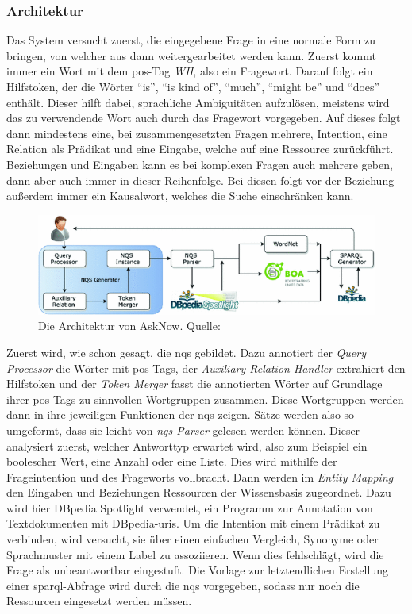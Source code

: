\subsubsection{Architektur}

Das System versucht zuerst, die eingegebene Frage in eine normale Form zu bringen, von welcher aus dann weitergearbeitet werden kann.
Zuerst kommt immer ein Wort mit dem \ac{pos}-Tag \emph{WH}, also ein Fragewort.
Darauf folgt ein Hilfstoken, der die Wörter \enquote{is}, \enquote{is kind of}, \enquote{much}, \enquote{might be} und \enquote{does} enthält.
Dieser hilft dabei, sprachliche Ambiguitäten aufzulösen, meistens wird das zu verwendende Wort auch durch das Fragewort vorgegeben.
Auf dieses folgt dann mindestens eine, bei zusammengesetzten Fragen mehrere, Intention, eine Relation als Prädikat und eine Eingabe, welche auf eine Ressource zurückführt.
Beziehungen und Eingaben kann es bei komplexen Fragen auch mehrere geben, dann aber auch immer in dieser Reihenfolge.
Bei diesen folgt vor der Beziehung außerdem immer ein Kausalwort, welches die Suche einschränken kann.

\begin{figure}[htbp!]
\centering
\includegraphics[width=\textwidth, height=\textheight, keepaspectratio]{Images/AskNowArchitecture.png}
\caption[AskNow Architektur]{Die Architektur von AskNow. Quelle: \citet{asknow}}
\label{fig:asknow-architektur}
\end{figure}

Zuerst wird, wie schon gesagt, die \ac{nqs} gebildet.
Dazu annotiert der \emph{Query Processor} die Wörter mit \ac{pos}-Tags, der \emph{Auxiliary Relation Handler} extrahiert den Hilfstoken
und der \emph{Token Merger} fasst die annotierten Wörter auf Grundlage ihrer \ac{pos}-Tags zu sinnvollen Wortgruppen zusammen.
Diese Wortgruppen werden dann in ihre jeweiligen Funktionen der \ac{nqs} zeigen.
Sätze werden also so umgeformt, dass sie leicht von \emph{\ac{nqs}-Parser} gelesen werden können.
Dieser analysiert zuerst, welcher Antworttyp erwartet wird, also zum Beispiel ein boolescher Wert, eine Anzahl oder eine Liste.
Dies wird mithilfe der Frageintention und des Frageworts vollbracht.
Dann werden im \emph{Entity Mapping} den Eingaben und Beziehungen Ressourcen der Wissensbasis zugeordnet.
Dazu wird hier DBpedia Spotlight \citep{dbpediaspotlight} verwendet, ein Programm zur Annotation von Textdokumenten mit DBpedia-\acp{uri}.
Um die Intention mit einem Prädikat zu verbinden, wird versucht, sie über einen einfachen Vergleich,
Synonyme \citep{wordnet} oder Sprachmuster \citep{boapatternlibrary} mit einem Label zu assoziieren.
Wenn dies fehlschlägt, wird die Frage als unbeantwortbar eingestuft.
Die Vorlage zur letztendlichen Erstellung einer \ac{sparql}-Abfrage wird durch die \ac{nqs} vorgegeben, sodass nur noch die Ressourcen eingesetzt werden müssen.
